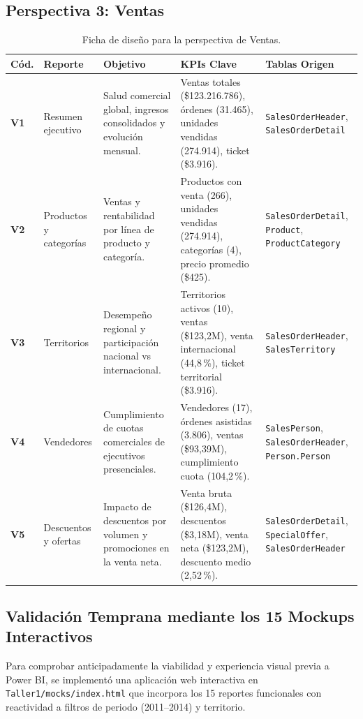 \documentclass[11pt,letterpaper]{article}
\begin{document}
\subsection{Perspectiva 3: Ventas}
\begin{table}[H]
\centering
\small
\begin{tabularx}{\textwidth}{lp{3.2cm}p{4.2cm}Xp{2.8cm}}
\toprule
\textbf{Cód.} & \textbf{Reporte} & \textbf{Objetivo} & \textbf{KPIs Clave} & \textbf{Tablas Origen} \\
\midrule
\textbf{V1} & Resumen ejecutivo & Salud comercial global, ingresos consolidados y evolución mensual. & Ventas totales (\$123.216.786), órdenes (31.465), unidades vendidas (274.914), ticket (\$3.916). & \texttt{SalesOrderHeader}, \texttt{SalesOrderDetail} \\
\addlinespace
\textbf{V2} & Productos y categorías & Ventas y rentabilidad por línea de producto y categoría. & Productos con venta (266), unidades vendidas (274.914), categorías (4), precio promedio (\$425). & \texttt{SalesOrderDetail}, \texttt{Product}, \texttt{ProductCategory} \\
\addlinespace
\textbf{V3} & Territorios & Desempeño regional y participación nacional vs internacional. & Territorios activos (10), ventas (\$123,2M), venta internacional (44,8\,\%), ticket territorial (\$3.916). & \texttt{SalesOrderHeader}, \texttt{SalesTerritory} \\
\addlinespace
\textbf{V4} & Vendedores & Cumplimiento de cuotas comerciales de ejecutivos presenciales. & Vendedores (17), órdenes asistidas (3.806), ventas (\$93,39M), cumplimiento cuota (104,2\,\%). & \texttt{SalesPerson}, \texttt{SalesOrderHeader}, \texttt{Person.Person} \\
\addlinespace
\textbf{V5} & Descuentos y ofertas & Impacto de descuentos por volumen y promociones en la venta neta. & Venta bruta (\$126,4M), descuentos (\$3,18M), venta neta (\$123,2M), descuento medio (2,52\,\%). & \texttt{SalesOrderDetail}, \texttt{SpecialOffer}, \texttt{SalesOrderHeader} \\
\bottomrule
\end{tabularx}
\caption{Ficha de diseño para la perspectiva de Ventas.}
\end{table}

\subsection{Validación Temprana mediante los 15 Mockups Interactivos}
Para comprobar anticipadamente la viabilidad y experiencia visual previa a Power BI, se implementó una aplicación web interactiva en \texttt{Taller1/mocks/index.html} que incorpora los 15 reportes funcionales con reactividad a filtros de periodo (2011--2014) y territorio.
\end{document}
